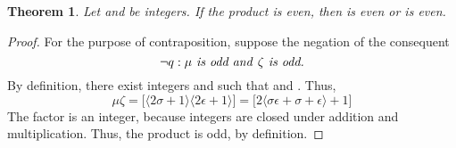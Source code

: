 \documentclass[preview]{standalone}
\newtheorem{theorem}{Theorem}
\begin{document}
\begin{theorem} %
    Let \bm{$\mu$} and \bm{$\zeta$} be integers. 
    If the product \bm{$\mu\zeta$} is even, 
    then \bm{$\mu$} is even or \bm{$\zeta$} is even.
\end{theorem}

\begin{proof}
    For the purpose of contraposition, suppose the negation of the consequent 
        $$\lnot q : \mu \text{\emph{ is odd and }} \zeta \text{\emph{ is odd.}}$$ 
    By definition, 
    there exist integers \bm{$\sigma$} and \bm{$\epsilon$} such that 
     and . 
    Thus, 
    \begin{equation*}
        \mu\zeta 
            =
        \Big[ 
            \big \langle 2 \sigma + 1 \big \rangle
            \big \langle 2 \epsilon + 1 \big \rangle 
        \Big]
            =
        \Big[ 
            2 
            \big \langle \sigma\epsilon + \sigma + \epsilon \big \rangle 
                + 
            1
        \Big]
    \end{equation*}
    The factor 
    \bm{$\big \langle \sigma \epsilon + \sigma + \epsilon \big \rangle$} 
    is an integer, 
    because integers are closed under addition and multiplication. 
    Thus, the product \bm{$\mu \zeta$} is odd, by definition.
\end{proof}
\end{document}
